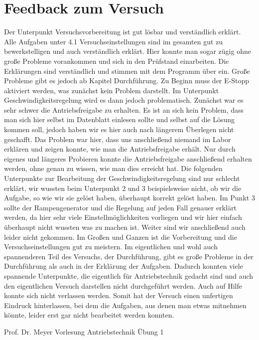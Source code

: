 \documentclass[10pt,a4paper,oneside,abstracton]{scrartcl}
\begin{document}
\section{Feedback zum Versuch}
Der Unterpunkt Versuchsvorbereitung ist gut lösbar und verständlich erklärt.\newline
Alle Aufgaben unter 4.1 Versuchseinstellungen sind im gesamten gut zu bewerkstelligen und auch verständlich erklärt. Hier konnte man sogar zügig ohne große Probleme vorankommen und sich in den Prüfstand einarbeiten. \newline
Die Erklärungen sind verständlich und stimmen mit dem Programm über ein.
Große Probleme gibt es jedoch ab Kapitel Durchführung.\newline
Zu Beginn muss der E-Stopp aktiviert werden, was zunächst kein Problem darstellt.\newline
Im Unterpunkt Geschwindigkeitsregelung wird es dann jedoch problematisch. Zunächst war es sehr schwer die Antriebsfreigabe zu erhalten. Es ist an sich kein Problem, dass man sich hier selbst im Datenblatt einlesen sollte und selbst auf die Lösung kommen soll, jedoch haben wir es hier auch nach längerem Überlegen nicht geschafft. \newline
Das Problem war hier, dass uns anschließend niemand im Labor erklären und zeigen konnte, wie man die Antriebsfreigabe erhält. Nur durch eigenes und längeres Probieren konnte die Antriebsfreigabe anschließend erhalten werden, ohne genau zu wissen, wie man dies erreicht hat.
Die folgenden Unterpunkte zur Bearbeitung der Geschwindigkeitsregelung sind nur schlecht erklärt, wir wussten beim Unterpunkt 2 und 3 beispielsweise nicht, ob wir die Aufgabe, so wie wir sie gelöst haben, überhaupt korrekt gelöst haben. \newline 
Im Punkt 3 sollte der Rampengenerator und die Regelung auf jeden Fall genauer erklärt werden, da hier sehr viele Einstellmöglichkeiten vorliegen und wir hier einfach überhaupt nicht wussten was zu machen ist.
Weiter sind wir anschließend auch leider nicht gekommen.\newline
Im Großen und Ganzen ist die Vorbereitung und die Versuchseinstellungen gut zu meistern. Im eigentlichen und wohl auch spannenderen Teil des Versuchs, der Durchführung, gibt es große Probleme in der Durchführung als auch in der Erklärung der Aufgaben. Dadurch konnten viele spannende Unterpunkte, die eigentlich für Antriebstechnik gedacht sind und auch den eigentlichen Versuch darstellen nicht durchgeführt werden. Auch auf Hilfe konnte sich nicht verlassen werden.
\newline
Somit hat der Versuch einen unfertigen Eindruck hinterlassen, bei dem die Aufgaben, aus denen man etwas mitnehmen könnte, leider erst gar nicht bearbeitet werden konnten.



\newpage

\listoffigures


\begin{thebibliography}{9}

	Prof. Dr. Meyer	Vorlesung Antriebstechnik Übung 1

\end{thebibliography}

 
\end{document}
